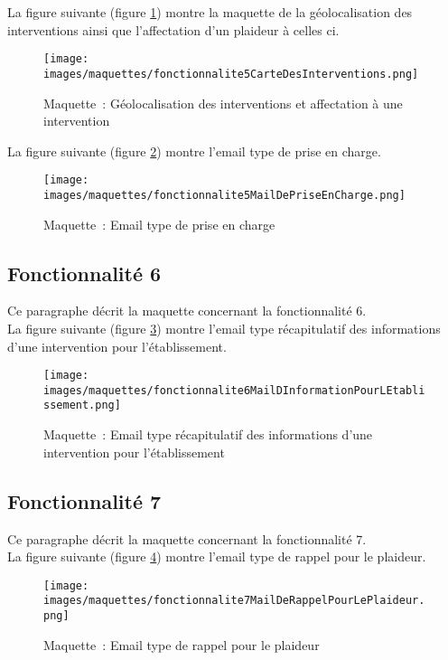 La figure suivante (figure \ref{maquette5-1}) montre la maquette de la géolocalisation des interventions ainsi que l'affectation d'un plaideur à celles ci. \\
\begin{figure}[H]
	\centering
	\texttt{[image: images/maquettes/fonctionnalite5CarteDesInterventions.png]}
	\caption{Maquette~: Géolocalisation des interventions et affectation à une intervention}
	\label{maquette5-1}
\end{figure}

La figure suivante (figure \ref{maquette5-2}) montre l'email type de prise en charge. \\
\begin{figure}[H]
	\centering
	\texttt{[image: images/maquettes/fonctionnalite5MailDePriseEnCharge.png]}
	\caption{Maquette~: Email type de prise en charge}
	\label{maquette5-2}
\end{figure}


\subsection{Fonctionnalité 6}
Ce paragraphe décrit la maquette concernant la fonctionnalité 6. \\

La figure suivante (figure \ref{maquette6}) montre l'email type récapitulatif des informations d'une intervention pour l'établissement.
\begin{figure}[H]
	\centering
	\texttt{[image: images/maquettes/fonctionnalite6MailDInformationPourLEtablissement.png]}
	\caption{Maquette~: Email type récapitulatif des informations d'une intervention pour l'établissement}
	\label{maquette6}
\end{figure}

\subsection{Fonctionnalité 7}
Ce paragraphe décrit la maquette concernant la fonctionnalité 7.\\

La figure suivante (figure \ref{maquette7}) montre l'email type de rappel pour le plaideur.
\begin{figure}[H]
	\centering
	\texttt{[image: images/maquettes/fonctionnalite7MailDeRappelPourLePlaideur.png]}
	\caption{Maquette~: Email type de rappel pour le plaideur}
	\label{maquette7}
\end{figure}

